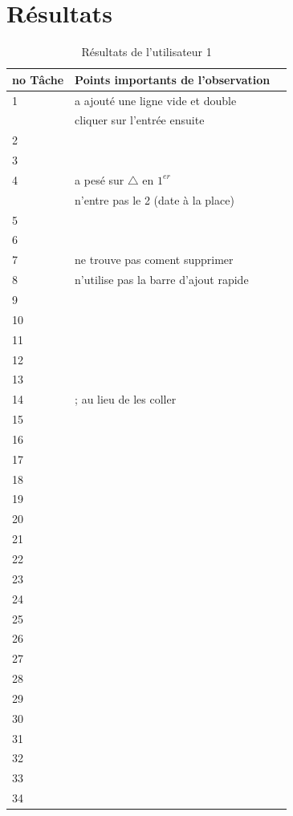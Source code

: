 \documentclass[letterpaper, oneside, 12pt, these, creativecommons]{thETS}
\begin{document}
\newpage

\section{Résultats}

\begin{table}
	\centering
	\begin{tabular}{|l|l|l|}
	\hline
	no Tâche	& Points importants de l'observation	\\ \hline
	1		& a ajouté une ligne vide et double	\\ 
			& cliquer sur l'entrée ensuite		\\ \hline
	2		& 						\\ \hline
	3		& 						\\ \hline
	4		& a pesé sur	$\bigtriangleup$ en $1^{er}$ \\
			& n'entre pas le 2 (date à la place)	\\ \hline
	5		& 						\\ \hline
	6		& 						\\ \hline
	7		& ne trouve pas coment supprimer	\\ \hline
	8		& n'utilise pas la barre d'ajout rapide	\\ \hline
	9		& 						\\ \hline
	10		& 						\\ \hline
	11		& 						\\ \hline
	12		& 						\\ \hline
	13		& 						\\ \hline
	14		& ; au lieu de les coller			\\ \hline
	15		& 						\\ \hline
	16		& 						\\ \hline
	17		& 						\\ \hline
	18		& 						\\ \hline
	19		& 						\\ \hline
	20		& 						\\ \hline
	21		& 						\\ \hline
	22		& 						\\ \hline
	23		& 						\\ \hline
	24		& 						\\ \hline
	25		& 						\\ \hline
	26		& 						\\ \hline
	27		& 						\\ \hline
	28		& 						\\ \hline
	29		& 						\\ \hline
	30		& 						\\ \hline
	31		& 						\\ \hline
	32		& 						\\ \hline
	33		& 						\\ \hline
	34		& 						\\ \hline
	\end{tabular}
	\caption{Résultats de l'utilisateur 1}
\end{table}
\end{document}
